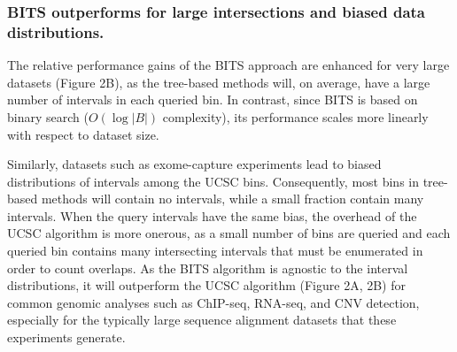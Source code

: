 \documentclass{bioinfo}
\begin{document}
        \subsubsection{BITS outperforms for large intersections and biased data distributions.}
        The relative performance gains of the BITS approach are enhanced for 
        very large datasets (Figure 2B), as the tree-based methods will, on 
        average, have a large number of intervals in each queried bin. In 
        contrast, since BITS is based on binary search ($O(\log |B|)$ 
        complexity), its performance scales more linearly with respect to 
        dataset size.

        Similarly, datasets such as exome-capture experiments lead to biased 
        distributions of intervals among the UCSC bins. Consequently, most 
        bins in tree-based methods will contain no intervals, while a small 
        fraction contain many intervals. When the query intervals
        have the same bias, the overhead of the UCSC algorithm is more 
        onerous, as a small number of bins are queried and each queried bin 
        contains many intersecting intervals that must be enumerated in order 
        to count overlaps. As the BITS algorithm is agnostic to the interval 
        distributions, it will outperform the UCSC algorithm (Figure 2A, 2B) 
        for common genomic analyses such as ChIP-seq, RNA-seq, and CNV 
        detection, especially for the typically large sequence alignment 
        datasets that these experiments generate.
        
        
        
        
\end{document}
